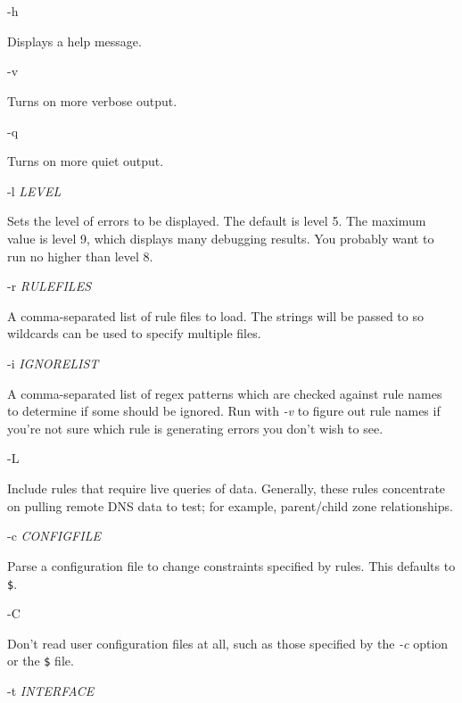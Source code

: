 \begin{description}

\item -h\verb" "

Displays a help message.

\item -v\verb" "

Turns on more verbose output.

\item -q\verb" "

Turns on more quiet output.

\item -l {\it LEVEL}\verb" "

Sets the level of errors to be displayed.  The default is level 5.
The maximum value is level 9, which displays many debugging results.
You probably want to run no higher than level 8.

\item -r {\it RULEFILES}\verb" "

A comma-separated list of rule files to load.  The strings will be
passed to  so \* wildcards can be used to specify multiple files.

\item -i {\it IGNORELIST}\verb" "

A comma-separated list of regex patterns which are checked against
rule names to determine if some should be ignored.  Run with {\it -v} to
figure out rule names if you're not sure which rule is generating
errors you don't wish to see.

\item -L\verb" "

Include rules that require live queries of data.  Generally, these
rules concentrate on pulling remote DNS data to test;
for example, parent/child zone relationships.

\item -c {\it CONFIGFILE}\verb" "

Parse a configuration file to change constraints specified by rules.
This defaults to \verb"$".

\item -C\verb" "

Don't read user configuration files at all, such as those specified by
the {\it -c} option or the \verb"$" file.

\item -t {\it INTERFACE}\verb" "


\end{description}
